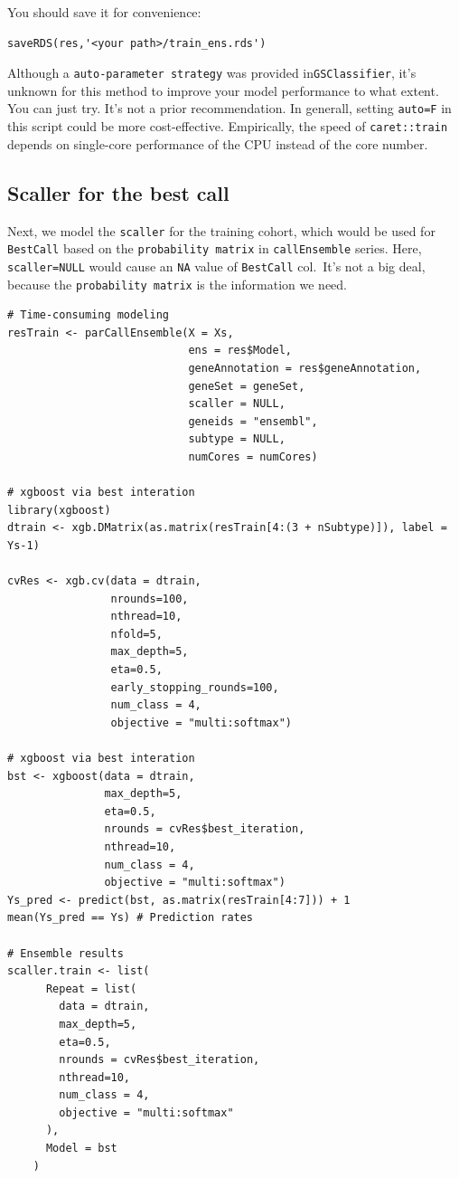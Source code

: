 \documentclass[
  12pt,
]{book}
\begin{document}
You should save it for convenience:

\begin{verbatim}
saveRDS(res,'<your path>/train_ens.rds')
\end{verbatim}

Although a \texttt{auto-parameter\ strategy} was provided in\texttt{GSClassifier}, it's unknown for this method to improve your model performance to what extent. You can just try. It's not a prior recommendation. In generall, setting \texttt{auto=F} in this script could be more cost-effective. Empirically, the speed of \texttt{caret::train} depends on single-core performance of the CPU instead of the core number.

\hypertarget{scaller-for-the-best-call}{%
\subsection{Scaller for the best call}\label{scaller-for-the-best-call}}

Next, we model the \texttt{scaller} for the training cohort, which would be used for \texttt{BestCall} based on the \texttt{probability\ matrix} in \texttt{callEnsemble} series. Here, \texttt{scaller=NULL} would cause an \texttt{NA} value of \texttt{BestCall} col.~It's not a big deal, because the \texttt{probability\ matrix} is the information we need.

\begin{verbatim}
# Time-consuming modeling
resTrain <- parCallEnsemble(X = Xs,
                            ens = res$Model,
                            geneAnnotation = res$geneAnnotation,
                            geneSet = geneSet,
                            scaller = NULL,
                            geneids = "ensembl",
                            subtype = NULL,
                            numCores = numCores)

# xgboost via best interation
library(xgboost)
dtrain <- xgb.DMatrix(as.matrix(resTrain[4:(3 + nSubtype)]), label = Ys-1)

cvRes <- xgb.cv(data = dtrain,
                nrounds=100,
                nthread=10,
                nfold=5,
                max_depth=5,
                eta=0.5,
                early_stopping_rounds=100,
                num_class = 4,
                objective = "multi:softmax")

# xgboost via best interation
bst <- xgboost(data = dtrain,
               max_depth=5,
               eta=0.5,
               nrounds = cvRes$best_iteration,
               nthread=10,
               num_class = 4,
               objective = "multi:softmax")
Ys_pred <- predict(bst, as.matrix(resTrain[4:7])) + 1
mean(Ys_pred == Ys) # Prediction rates

# Ensemble results
scaller.train <- list(
      Repeat = list(
        data = dtrain,
        max_depth=5,
        eta=0.5,
        nrounds = cvRes$best_iteration,
        nthread=10,
        num_class = 4,
        objective = "multi:softmax"
      ), 
      Model = bst
    )
\end{verbatim}
\end{document}
